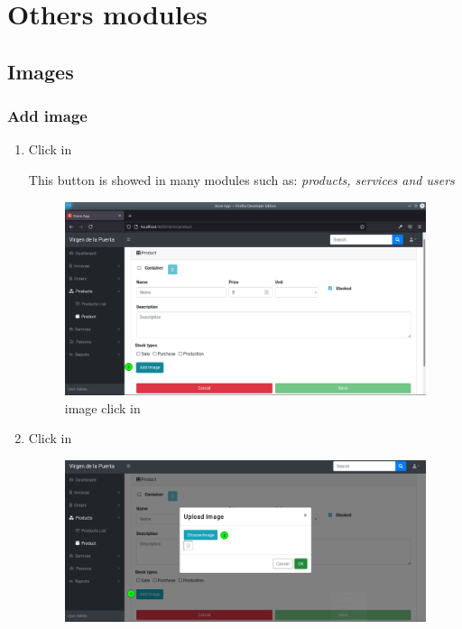 \documentclass[a4paper,11pt]{refart}
\begin{document}
\section{Others modules}
\subsection{Images}
\subsubsection{Add image}\label{section:add_image}
\begin{enumerate}
	\item Click in 
	\medskip
	\begin{leftbar}
		This button is showed in many modules such as: \emph{products, services and users}
	\end{leftbar}
	\begin{figure}[H]\centering
		\includegraphics[width=\textwidth]{images/image-clickIn.png}
		\caption{image click in}
		\label{fig:image-clickIn}
	\end{figure}
	\item Click in 
	\begin{figure}[H]\centering
		\includegraphics[width=\textwidth]{images/image-modal.png}

\end{figure}
\end{enumerate}
\end{document}
